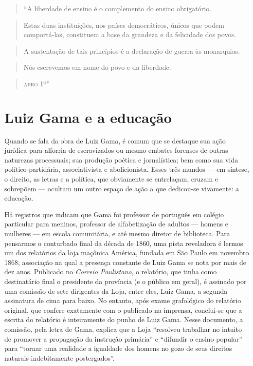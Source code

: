 \begin{quote}
``A liberdade de ensino é o complemento do ensino obrigatório.
\end{quote}

\begin{quote}
Estas duas instituições, nos países democráticos, únicos que podem
comportá-las, constituem a base da grandeza e da felicidade dos povos.
\end{quote}

\begin{quote}
A sustentação de tais princípios é a declaração de guerra às monarquias.
\end{quote}

\begin{quote}
Nós escrevemos em nome do povo e da liberdade.
\end{quote}
\begin{flushright}
\begin{quote}
\textsc{afro} 1º''
\end{quote}
\end{flushright}
\section{Luiz Gama e a educação}

Quando se fala da obra de Luiz Gama, é comum que se destaque sua ação
jurídica para alforria de escravizados ou mesmo embates forenses de
outras naturezas processuais; sua produção poética e jornalística; bem
como sua vida político-partidária, associativista e abolicionista. Esses
três mundos --- em síntese, o direito, as letras e a política, que
obviamente se entrelaçam, cruzam e sobrepõem --- ocultam um outro espaço
de ação a que dedicou-se vivamente: a educação.

Há registros que indicam que Gama foi professor de português em colégio
particular para meninos, professor de alfabetização de adultos --- homens
e mulheres --- em escola comunitária, e até mesmo diretor de biblioteca.
Para pensarmos o conturbado final da década de 1860, uma pista
reveladora é lermos um dos relatórios da loja maçônica América, fundada
em São Paulo em novembro 1868, associação na qual a presença constante
de Luiz Gama se nota por mais de dez anos. Publicado no \emph{Correio
Paulistano}, o relatório, que tinha como destinatário final o presidente
da província (e o público em geral), é assinado por uma comissão de sete
dirigentes da Loja, entre eles, Luiz Gama, a segunda assinatura de cima
para baixo. No entanto, após exame grafológico do relatório original,
que confere exatamente com o publicado na imprensa, conclui-se que a
escrita do relatório é inteiramente do punho de Luiz Gama. Nesse
documento, a comissão, pela letra de Gama, explica que a Loja ``resolveu
trabalhar no intuito de promover a propagação da instrução primária'' e
``difundir o ensino popular'' para ``tornar uma realidade a igualdade dos
homens no gozo de seus direitos naturais indebitamente postergados''.

